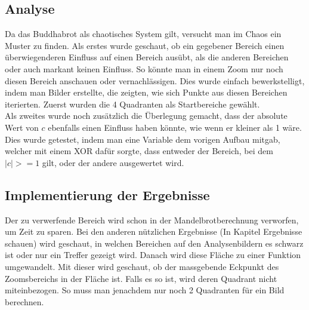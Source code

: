 \subsection{Analyse}
Da das Buddhabrot als chaotisches System gilt, versucht man im Chaos ein Muster zu finden. Als erstes wurde geschaut, ob ein gegebener Bereich einen überwiegenderen Einfluss auf einen Bereich ausübt, als die anderen Bereichen oder auch markant keinen Einfluss. So könnte man in einem Zoom nur noch diesen Bereich anschauen oder vernachlässigen. Dies wurde einfach bewerkstelligt, indem man Bilder erstellte, die zeigten, wie sich Punkte aus diesen Bereichen iterierten. Zuerst wurden die 4 Quadranten als Startbereiche gewählt.
\\
Als zweites wurde noch zusätzlich die Überlegung gemacht, dass der absolute Wert von $c$ ebenfalls einen Einfluss haben könnte, wie wenn er kleiner als 1 wäre. Dies wurde getestet, indem man eine Variable dem vorigen Aufbau mitgab, welcher mit einem XOR dafür sorgte, dass entweder der Bereich, bei dem $|c|>=1$ gilt, oder der andere ausgewertet wird.
\subsection{Implementierung der Ergebnisse}
Der zu verwerfende Bereich wird schon in der Mandelbrotberechnung verworfen, um Zeit zu sparen. Bei den anderen nützlichen Ergebnisse (In Kapitel Ergebnisse schauen) wird geschaut, in welchen Bereichen auf den Analysenbildern es schwarz ist oder nur ein Treffer gezeigt wird. Danach wird diese Fläche zu einer Funktion umgewandelt. Mit dieser wird geschaut, ob der massgebende Eckpunkt des Zoomsbereichs in der Fläche ist. Falls es so ist, wird deren Quadrant nicht miteinbezogen. So muss man jenachdem nur noch 2 Quadranten für ein Bild berechnen.